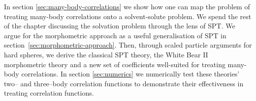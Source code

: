 \documentclass[11pt,twoside]{report}
\begin{document}




In section \ref{sec:many-body-correlations} we show how one can map the problem of treating many-body correlations onto a solvent-solute problem.
We spend the rest of the chapter discussing the solvation problem through the lens of SPT.
We argue for the morphometric approach as a useful generalisation of SPT in section~\ref{sec:morphometric-approach}.
Then, through scaled particle arguments for hard spheres, we derive the classical SPT theory, the White Bear II morphometric theory \cite{Hansen-GoosJPCM2006} and a new set of coefficients well-suited for treating many-body correlations.
In section \ref{sec:numerics} we numerically test these theories' two-- and three--body correlation functions to demonstrate their effectiveness in treating correlation functions.
\end{document}
